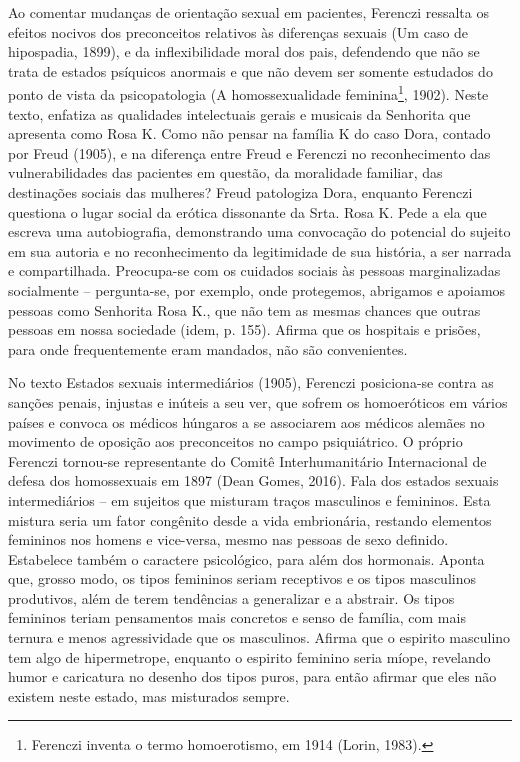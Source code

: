 Ao comentar mudanças de orientação sexual em pacientes, Ferenczi
ressalta os efeitos nocivos dos preconceitos relativos às diferenças
sexuais (Um caso de hipospadia, 1899), e da inflexibilidade moral dos
pais, defendendo que não se trata de estados psíquicos anormais e que
não devem ser somente estudados do ponto de vista da psicopatologia (A
homossexualidade feminina\footnote{Ferenczi inventa o termo
  homoerotismo, em 1914 (Lorin, 1983).}, 1902). Neste texto, enfatiza as
qualidades intelectuais gerais e musicais da Senhorita que apresenta
como Rosa K. Como não pensar na família K do caso Dora, contado por
Freud (1905), e na diferença entre Freud e Ferenczi no reconhecimento
das vulnerabilidades das pacientes em questão, da moralidade familiar,
das destinações sociais das mulheres? Freud patologiza Dora, enquanto
Ferenczi questiona o lugar social da erótica dissonante da Srta. Rosa K.
Pede a ela que escreva uma autobiografia, demonstrando uma convocação do
potencial do sujeito em sua autoria e no reconhecimento da legitimidade
de sua história, a ser narrada e compartilhada. Preocupa-se com os
cuidados sociais às pessoas marginalizadas socialmente -- pergunta-se,
por exemplo, onde protegemos, abrigamos e apoiamos pessoas como
Senhorita Rosa K., que não tem as mesmas chances que outras pessoas em
nossa sociedade (idem, p. 155). Afirma que os hospitais e prisões, para
onde frequentemente eram mandados, não são convenientes.

No texto Estados sexuais intermediários (1905), Ferenczi posiciona-se
contra as sanções penais, injustas e inúteis a seu ver, que sofrem os
homoeróticos em vários países e convoca os médicos húngaros a se
associarem aos médicos alemães no movimento de oposição aos preconceitos
no campo psiquiátrico. O próprio Ferenczi tornou-se representante do
Comitê Interhumanitário Internacional de defesa dos homossexuais em 1897
(Dean Gomes, 2016). Fala dos estados sexuais intermediários -- em
sujeitos que misturam traços masculinos e femininos. Esta mistura seria
um fator congênito desde a vida embrionária, restando elementos
femininos nos homens e vice-versa, mesmo nas pessoas de sexo definido.
Estabelece também o caractere psicológico, para além dos hormonais.
Aponta que, grosso modo, os tipos femininos seriam receptivos e os tipos
masculinos produtivos, além de terem tendências a generalizar e a
abstrair. Os tipos femininos teriam pensamentos mais concretos e senso
de família, com mais ternura e menos agressividade que os masculinos.
Afirma que o espirito masculino tem algo de hipermetrope, enquanto o
espirito feminino seria míope, revelando humor e caricatura no desenho
dos tipos puros, para então afirmar que eles não existem neste estado,
mas misturados sempre.


